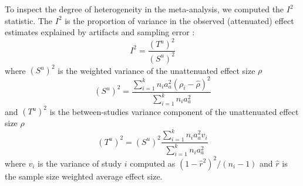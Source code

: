 To inspect the degree of heterogeneity in the meta-analysis, we computed the $I^2$ statistic. The $I^2$ is the proportion of variance in the observed (attenuated) effect estimates explained by artifacts and sampling error \citep{borenstein2011introduction}: 
%
\begin{equation}
\label{eq:i2_statistic}
I^2 = \frac{(T^u)^2}{(S^u)^2}
\end{equation}
%
where $(S^u)^2$ is the weighted variance of the unattenuated effect size $\rho$
%
\begin{equation}
\label{eq:Su2_var}
(S^u)^2 = \frac{\sum_{i=1}^k n_i a_a^2 (\rho_i - \hat{\rho})^2}{\sum_{i=1}^k n_i a_a^2}
\end{equation}
%
and $(T^u)^2$ is the between-studies variance component of the unattenuated effect size $\rho$
%
\begin{equation}
\label{eq:Tu2_var}
(T^u)^2 = (S^u)^2 \frac{\sum_{i=1}^k n_i a_a^2 v_i}{\sum_{i=1}^k n_i a_a^2}
\end{equation}
%
where $v_i$ is the variance of study $i$ computed as $(1 - \hat{r}^2)^2 / (n_i - 1)$ and $\hat{r}$ is the sample size weighted average effect size. 


